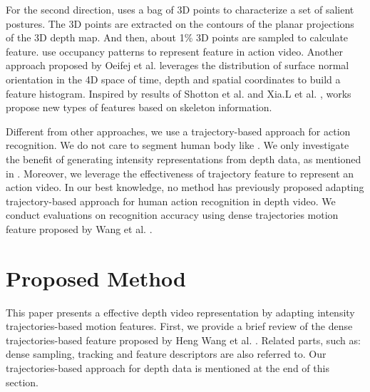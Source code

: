 \documentclass[review]{elsarticle}
\begin{document}
For the second direction, \cite{li2010action} uses a bag of 3D points to characterize a set of salient postures. The 3D points are extracted on the contours of the planar projections of the 3D depth map. And then, about 1\% 3D points are sampled to calculate feature. \cite{vieira2012stop, wang2012robust, wang2012mining} use occupancy patterns to represent feature in action video. Another approach proposed by Oeifej et al. \cite{oreifej2013hon4d} leverages the distribution of surface normal orientation in the 4D space of time, depth and spatial coordinates to build a feature histogram. Inspired by results of Shotton et al. \cite{shotton2013real} and Xia.L et al. \cite{xia2011human}, works \cite{yang2012eigenjoints, wang2012mining} propose new types of features based on skeleton information.

Different from other approaches, we use a trajectory-based approach for action recognition. We do not care to segment human body like \cite{li2010action,yang2012recognizing}. We only investigate the benefit of generating intensity representations from depth data, as mentioned in \cite{li2010action,yang2012recognizing}. Moreover, we leverage the effectiveness of trajectory feature to represent an action video. In our best knowledge, no method has previously proposed adapting trajectory-based approach for human action recognition in depth video. We conduct evaluations on recognition accuracy using dense trajectories motion feature proposed by Wang et al. \cite{wang2011densetraj}.

\section{Proposed Method}
\label{lbl:ProposedMethod}

This paper presents a effective depth video representation by adapting intensity trajectories-based motion features. First, we provide a brief review of the dense trajectories-based feature proposed by Heng Wang et al. \cite{wang2011densetraj}. Related parts, such as: dense sampling, tracking and feature descriptors are also referred to. Our trajectories-based approach for depth data is mentioned at the end of this section.
\end{document}
